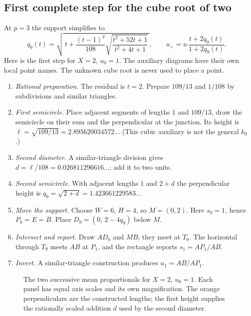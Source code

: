 \subsection{First complete step for the cube root of two}

At $p=3$ the support simplifies to
\begin{equation}\label{eq:cubic}
q_9(t)=\sqrt{\,t+\frac{(t-1)^{2}}{108}\sqrt{\frac{t^{2}+52t+1}{t^{2}+4t+1}}\,},\qquad
u_+=u\,\frac{t+2q_9(t)}{1+2q_9(t)} .
\end{equation}
Here is the first step for $X=2$, $u_0=1$. The auxiliary diagrams have their own local point names. The
unknown cube root is never used to place a point.
\begin{enumerate}[label=\arabic*.]
\item \emph{Rational preparation.} The residual is $t=2$. Prepare $109/13$ and $1/108$ by subdivisions
  and similar triangles.
\item \emph{First semicircle.} Place adjacent segments of lengths $1$ and $109/13$, draw the semicircle
  on their sum and the perpendicular at the junction. Its height is
  $\ell=\sqrt{109/13}=2.895620034572\ldots$ (This cubic auxiliary is not the general $k_9$.)
\item \emph{Second diameter.} A similar-triangle division gives $d=\ell/108=0.026811296616\ldots$; add it
  to two units.
\item \emph{Second semicircle.} With adjacent lengths $1$ and $2+d$ the perpendicular height is
  $q_9=\sqrt{2+d}=1.423661229583\ldots$
\item \emph{Move the support.} Choose $W=6$, $H=4$, so $M=(0,2)$. Here $s_0=1$, hence $P_0=E=B$. Place
  $D_9=(0,\,2-4q_9)$ below $M$.
\item \emph{Intersect and report.} Draw $AD_9$ and $MB$; they meet at $T_9$. The horizontal through $T_9$
  meets $AB$ at $P_1$, and the rectangle reports $s_1=AP_1/AB$.
\item \emph{Invert.} A similar-triangle construction produces $u_1=AB/AP_1$.
\end{enumerate}

\begin{figure}[h]
\centering\figMeans
\caption{The two successive mean proportionals for $X=2$, $u_0=1$. Each panel has equal axis scales and
its own magnification. The orange perpendiculars are the constructed lengths; the first height supplies
the rationally scaled addition $d$ used by the second diameter.}\label{fig:means}
\end{figure}

